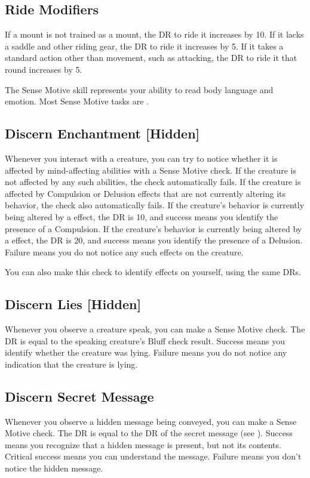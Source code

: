     \subsection{Ride Modifiers}\label{Ride Modifiers}
        If a mount is not trained as a mount, the DR to ride it increases by 10.
        If it lacks a saddle and other riding gear, the DR to ride it increases by 5. If it takes a standard action other than movement, such as attacking, the DR to ride it that round increases by 5.

\newpage
{}
        The Sense Motive skill represents your ability to read body language and emotion.
        Most Sense Motive tasks are .

    \subsection{Discern Enchantment [Hidden]}
        Whenever you interact with a creature, you can try to notice whether it is affected by mind-affecting abilities with a Sense Motive check.
        If the creature is not affected by any such abilities, the check automatically fails.
        If the creature is affected by Compulsion or Delusion effects that are not currently altering its behavior, the check also automatically fails.
        If the creature's behavior is currently being altered by a  effect, the DR is 10, and success means you identify the presence of a Compulsion.
        If the creature's behavior is currently being altered by a  effect, the DR is 20, and success means you identify the presence of a Delusion.
        Failure means you do not notice any such effects on the creature.

        You can also make this check to identify  effects on yourself, using the same DRs.

    \subsection{Discern Lies [Hidden]}
        Whenever you observe a creature speak, you can make a Sense Motive check.
        The DR is equal to the speaking creature's Bluff check result.
        Success means you identify whether the creature was lying.
        Failure means you do not notice any indication that the creature is lying.

    \subsection{Discern Secret Message}
        Whenever you observe a hidden message being conveyed, you can make a Sense Motive check.
        The DR is equal to the DR of the secret message (see ).
        Success means you recognize that a hidden message is present, but not its contents.
        Critical success means you can understand the message.
        Failure means you don't notice the hidden message.

